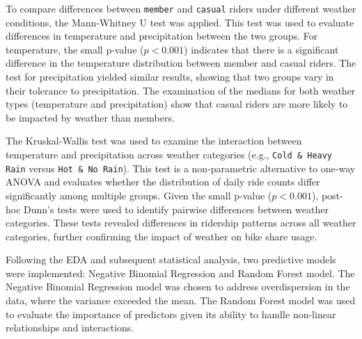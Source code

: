 \documentclass{article}
\begin{document}
To compare differences between \texttt{member} and \texttt{casual} riders under different weather conditions, the Mann-Whitney U test was applied. This test was used to evaluate differences in temperature and precipitation between the two groups. For temperature, the small p-value (\( p < 0.001 \)) indicates that there is a significant difference in the temperature distribution between member and casual riders. The test for precipitation yielded similar results, showing that two groups vary in their tolerance to precipitation. The examination of the medians for both weather types (temperature and precipitation) show that casual riders are more likely to be impacted by weather than members.

The Kruskal-Wallis test was used to examine the interaction between temperature and precipitation across weather categories (e.g., \texttt{Cold \& Heavy Rain} versus \texttt{Hot \& No Rain}). This test is a non-parametric alternative to one-way ANOVA and evaluates whether the distribution of daily ride counts differ significantly among multiple groups. Given the small p-value (\( p < 0.001 \)), post-hoc Dunn's tests were used to identify pairwise differences between weather categories. These tests revealed differences in ridership patterns across all weather categories, further confirming the impact of weather on bike share usage.

Following the EDA and subsequent statistical analysis, two predictive models were implemented: Negative Binomial Regression and Random Forest model. The Negative Binomial Regression model was chosen to address overdispersion in the data, where the variance exceeded the mean. The Random Forest model was used to evaluate the importance of predictors given its ability to handle non-linear relationships and interactions.
\end{document}
